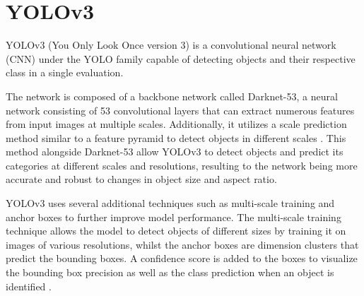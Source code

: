 \section{YOLOv3}

 YOLOv3 (You Only Look Once version 3) is a convolutional neural network (CNN) under the YOLO family capable of detecting objects and their respective class in a single evaluation. 

 The network is composed of a backbone network called Darknet-53, a neural network consisting of 53 convolutional layers that can extract numerous features from input images at multiple scales. Additionally, it utilizes a scale prediction method similar to a feature pyramid to detect objects in different scales \cite{redmonYOLOv3IncrementalImprovement2018}. This method alongside Darknet-53 allow YOLOv3 to detect objects and predict its categories at different scales and resolutions, resulting to the network being more accurate and robust to changes in object size and aspect ratio.

YOLOv3 uses several additional techniques such as multi-scale training and anchor boxes to further improve model performance. The multi-scale training technique allows the model to detect objects of different sizes by training it on images of various resolutions, whilst the anchor boxes are dimension clusters that predict the bounding boxes. A confidence score is added to the boxes to visualize the bounding box precision as well as the class prediction when an object is identified \cite{redmonYOLOv3IncrementalImprovement2018}. 